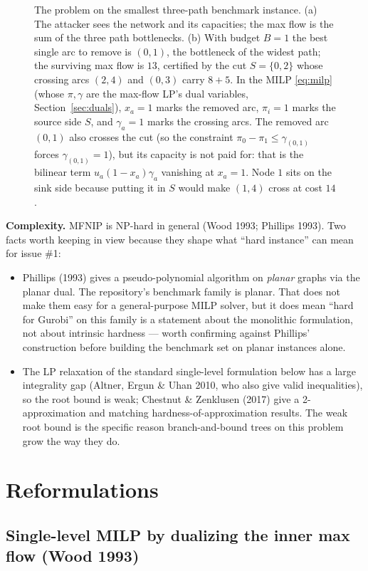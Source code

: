 \documentclass[11pt]{article}
\begin{document}
\begin{figure}[h]
\caption{The problem on the smallest three-path benchmark instance. (a) The attacker sees the network and its capacities; the max flow is the sum of the three path bottlenecks. (b) With budget $B=1$ the best single arc to remove is $(0,1)$, the bottleneck of the widest path; the surviving max flow is $13$, certified by the cut $S=\{0,2\}$ whose crossing arcs $(2,4)$ and $(0,3)$ carry $8+5$. In the MILP \eqref{eq:milp} (whose $\pi,\gamma$ are the max-flow LP's dual variables, Section~\ref{sec:duals}), $x_a=1$ marks the removed arc, $\pi_i=1$ marks the source side $S$, and $\gamma_a=1$ marks the crossing arcs. The removed arc $(0,1)$ also crosses the cut (so the constraint $\pi_0-\pi_1\le\gamma_{(0,1)}$ forces $\gamma_{(0,1)}=1$), but its capacity is not paid for: that is the bilinear term $u_a(1-x_a)\gamma_a$ vanishing at $x_a=1$. Node $1$ sits on the sink side because putting it in $S$ would make $(1,4)$ cross at cost $14$.}
\label{fig:problem}
\end{figure}

\textbf{Complexity.} MFNIP is NP-hard in general (Wood 1993; Phillips 1993). Two facts worth keeping in view because they shape what ``hard instance'' can mean for issue \#1:
\begin{itemize}[leftmargin=1.5em]
\item Phillips (1993) gives a pseudo-polynomial algorithm on \emph{planar} graphs via the planar dual. The repository's benchmark family is planar. That does not make them easy for a general-purpose MILP solver, but it does mean ``hard for Gurobi'' on this family is a statement about the monolithic formulation, not about intrinsic hardness --- worth confirming against Phillips' construction before building the benchmark set on planar instances alone.
\item The LP relaxation of the standard single-level formulation below has a large integrality gap (Altner, Ergun \& Uhan 2010, who also give valid inequalities), so the root bound is weak; Chestnut \& Zenklusen (2017) give a 2-approximation and matching hardness-of-approximation results. The weak root bound is the specific reason branch-and-bound trees on this problem grow the way they do.
\end{itemize}

\section{Reformulations}

\subsection{Single-level MILP by dualizing the inner max flow (Wood 1993)}
\end{document}
